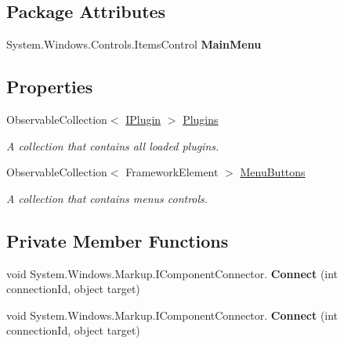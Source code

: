 \subsection*{Package Attributes}
\begin{DoxyCompactItemize}
\item 
\mbox{\label{class_wpf_handler_1_1_u_i_1_1_controls_1_1_catalog_view_afa1ca29284af69857b98e9f01fd55cb2}} 
System.\+Windows.\+Controls.\+Items\+Control {\bfseries Main\+Menu}
\end{DoxyCompactItemize}
\subsection*{Properties}
\begin{DoxyCompactItemize}
\item 
Observable\+Collection$<$ \mbox{\hyperlink{interface_wpf_handler_1_1_plugins_1_1_i_plugin}{I\+Plugin}} $>$ \mbox{\hyperlink{class_wpf_handler_1_1_u_i_1_1_controls_1_1_catalog_view_a7672bbed750a86616eb69af0cec22728}{Plugins}}
\begin{DoxyCompactList}\small\item\em A collection that contains all loaded plugins. \end{DoxyCompactList}\item 
Observable\+Collection$<$ Framework\+Element $>$ \mbox{\hyperlink{class_wpf_handler_1_1_u_i_1_1_controls_1_1_catalog_view_a2cca758ee3885d67264eea318ea83b91}{Menu\+Buttons}}
\begin{DoxyCompactList}\small\item\em A collection that contains menu\textquotesingle{}s controls. \end{DoxyCompactList}\end{DoxyCompactItemize}
\subsection*{Private Member Functions}
\begin{DoxyCompactItemize}
\item 
\mbox{\label{class_wpf_handler_1_1_u_i_1_1_controls_1_1_catalog_view_a494d414ffd5a4bc6df0a11e136399b9c}} 
void System.\+Windows.\+Markup.\+I\+Component\+Connector. {\bfseries Connect} (int connection\+Id, object target)
\item 
\mbox{\label{class_wpf_handler_1_1_u_i_1_1_controls_1_1_catalog_view_a494d414ffd5a4bc6df0a11e136399b9c}} 
void System.\+Windows.\+Markup.\+I\+Component\+Connector. {\bfseries Connect} (int connection\+Id, object target)
\end{DoxyCompactItemize}
